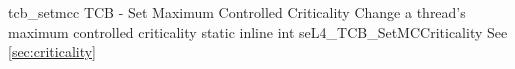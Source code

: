 %
%
%
%

\apidoc
{tcb_setmcc}
{TCB - Set Maximum Controlled Criticality}
{Change a thread's maximum controlled criticality}
{static inline int seL4\_TCB\_SetMCCriticality }
{
}
{\errorenumdesc}
{See \autoref{sec:criticality}}
